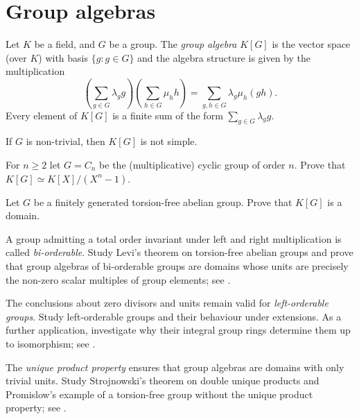 \section{Group algebras}
\lecture

Let $K$ be a field, and $G$ be a group. The \emph{group algebra} $K[G]$ 
is the vector space (over $K$) with basis $\{g:g\in G\}$ 
and the algebra structure is given by the multiplication
\[
	\left(\sum_{g\in G}\lambda_gg\right)\left(\sum_{h\in G}\mu_hh\right)
	=\sum_{g,h\in G}\lambda_g\mu_h(gh).
\]
Every element of $K[G]$ is a finite sum of the form $\sum_{g\in G}\lambda_gg$.

\begin{exercise}
\label{xc:K[G]notsimple}
    If $G$ is non-trivial, then $K[G]$ is not simple. 
\end{exercise}

\begin{exercise}
\label{xca:K_cyclic}
  For $n\geq2$ let $G=C_n$ be the (multiplicative) cyclic group of order $n$.
  Prove that $K[G]\simeq K[X]/(X^n-1)$. 
\end{exercise}

\begin{exercise}
\label{xca:abelian=>domain}
	Let $G$ be a finitely generated torsion-free abelian group. Prove that 
	$K[G]$ is a domain. 
\end{exercise}

\project
A group admitting a total order invariant under left and right
multiplication is called \emph{bi-orderable}. Study Levi's theorem
on torsion-free abelian groups and prove that group algebras
of bi-orderable groups are domains whose units are precisely
the non-zero scalar multiples of group elements;
see \cite{MR798076}.

\smallskip 
\project
The conclusions about zero divisors and units remain valid
for \emph{left-orderable groups}. 
Study left-orderable groups and their behaviour under extensions.
As a further application, investigate why their integral group
rings determine them up to isomorphism;
see \cite{MR798076}.

\smallskip 
\project
The \emph{unique product property}  ensures that group algebras are
domains with only trivial units. Study Strojnowski's theorem
on double unique products and Promislow's example of a
torsion-free group without the unique product property;
see \cite{MR798076}.


